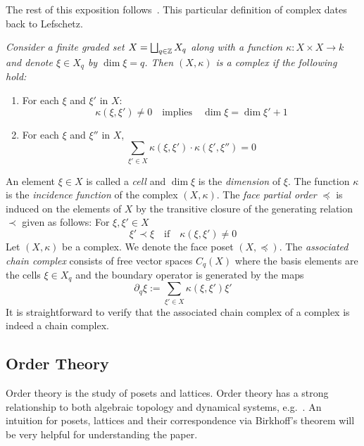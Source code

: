 The rest of this exposition follows~\cite{focm,mn}.  This particular definition of complex dates back to Lefschetz.

\begin{defn}
{\em
Consider a finite graded set $X = \bigsqcup_{q\in {\mathbb{Z}}} X_q$ along with a function $\kappa:X\times X\to k$ and denote $\xi\in X_q$ by $\dim \xi = q$.  Then $(X,\kappa)$ is a {\em complex} if the following hold:
\begin{enumerate}
\item \label{cond:1} For each $\xi$ and $\xi'$ in $X$:
$$\kappa(\xi,\xi')\neq 0\quad\text{implies}\quad \dim \xi = \dim \xi'+1$$
\item\label{cond:2} For each $\xi$ and $\xi''$ in $X$,
$$\sum_{\xi'\in X} \kappa(\xi,\xi')\cdot \kappa(\xi',\xi'')=0$$
\end{enumerate}
}
\end{defn}

An element $\xi\in X$ is called a {\em cell} and $\dim \xi$ is the {\em dimension} of $\xi$.  The function $\kappa$ is the {\em incidence function} of the complex $(X,\kappa)$.   The {\em face partial order} $\preceq$ is induced on the elements of $X$ by the transitive closure of the generating relation $\prec$ given as follows: For $\xi, \xi'\in X$ $$\xi' \prec \xi \quad \text{if} \quad \kappa(\xi,\xi')\neq 0$$
Let $(X,\kappa)$ be a complex.  We denote the face poset $(X,\preceq)$.  The {\em associated chain complex} consists of free vector spaces $C_q(X)$ where the basis elements are the cells $\xi \in X_q$ and the boundary operator is generated by the maps $$\partial_q \xi := \sum_{\xi' \in X} \kappa(\xi, \xi')\xi'$$ It is straightforward to verify that the associated chain complex of a complex is indeed a chain complex.











\subsection{Order Theory}\label{sec:prelims:order}

Order theory is the study of posets and lattices.  Order theory has a strong relationship to both algebraic topology and dynamical systems, e.g.~\cite{salamon,lsa,lsa2}.  An intuition for posets, lattices and their correspondence via Birkhoff's theorem will be very helpful for understanding the paper.


